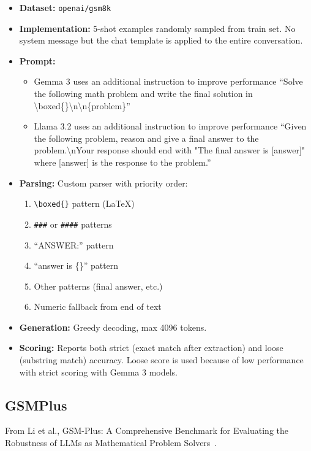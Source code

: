 \documentclass{article}
\begin{document}
\begin{itemize}
    \item \textbf{Dataset:} \texttt{openai/gsm8k}
    \item \textbf{Implementation:} 5-shot examples randomly sampled from train set. No system message but the chat template is applied to the entire conversation.
    \item \textbf{Prompt:}
    \begin{itemize}
        \item Gemma 3 uses an additional instruction to improve performance ``Solve the following math problem and write the final solution in \textbackslash boxed\{\}\textbackslash n\textbackslash n\{problem\}''
        \item Llama 3.2 uses an additional instruction to improve performance ``Given the following problem, reason and give a final answer to the problem.\textbackslash nYour response should end with "The final answer is [answer]" where [answer] is the response to the problem.''
    \end{itemize}
    \item \textbf{Parsing:} Custom parser with priority order:
    \begin{enumerate}
        \item \texttt{\textbackslash boxed\{\}} pattern (LaTeX)
        \item \texttt{\#\#\#} or \texttt{\#\#\#\#} patterns
        \item ``ANSWER:'' pattern
        \item ``answer is \{\}'' pattern
        \item Other patterns (final answer, etc.)
        \item Numeric fallback from end of text
    \end{enumerate}
    \item \textbf{Generation:} Greedy decoding, max 4096 tokens.
    \item \textbf{Scoring:} Reports both strict (exact match after extraction) and loose (substring match) accuracy. Loose score is used because of low performance with strict scoring with Gemma 3 models.
\end{itemize}

\subsection*{GSMPlus}

From Li et al., GSM-Plus: A Comprehensive Benchmark for Evaluating the Robustness of LLMs as Mathematical Problem Solvers~\citep{li2024gsmplus}.
\end{document}
